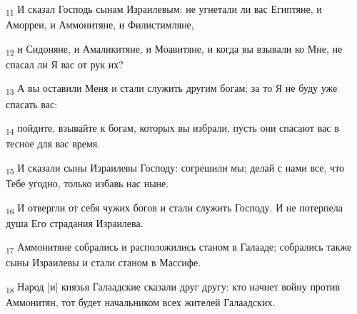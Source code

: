 \begin{tcolorbox}
\textsubscript{11} И сказал Господь сынам Израилевым: не угнетали ли вас Египтяне, и Аморреи, и Аммонитяне, и Филистимляне,
\end{tcolorbox}
\begin{tcolorbox}
\textsubscript{12} и Сидоняне, и Амаликитяне, и Моавитяне, и когда вы взывали ко Мне, не спасал ли Я вас от рук их?
\end{tcolorbox}
\begin{tcolorbox}
\textsubscript{13} А вы оставили Меня и стали служить другим богам; за то Я не буду уже спасать вас:
\end{tcolorbox}
\begin{tcolorbox}
\textsubscript{14} пойдите, взывайте к богам, которых вы избрали, пусть они спасают вас в тесное для вас время.
\end{tcolorbox}
\begin{tcolorbox}
\textsubscript{15} И сказали сыны Израилевы Господу: согрешили мы; делай с нами все, что Тебе угодно, только избавь нас ныне.
\end{tcolorbox}
\begin{tcolorbox}
\textsubscript{16} И отвергли от себя чужих богов и стали служить Господу. И не потерпела душа Его страдания Израилева.
\end{tcolorbox}
\begin{tcolorbox}
\textsubscript{17} Аммонитяне собрались и расположились станом в Галааде; собрались также сыны Израилевы и стали станом в Массифе.
\end{tcolorbox}
\begin{tcolorbox}
\textsubscript{18} Народ [и] князья Галаадские сказали друг другу: кто начнет войну против Аммонитян, тот будет начальником всех жителей Галаадских.
\end{tcolorbox}
